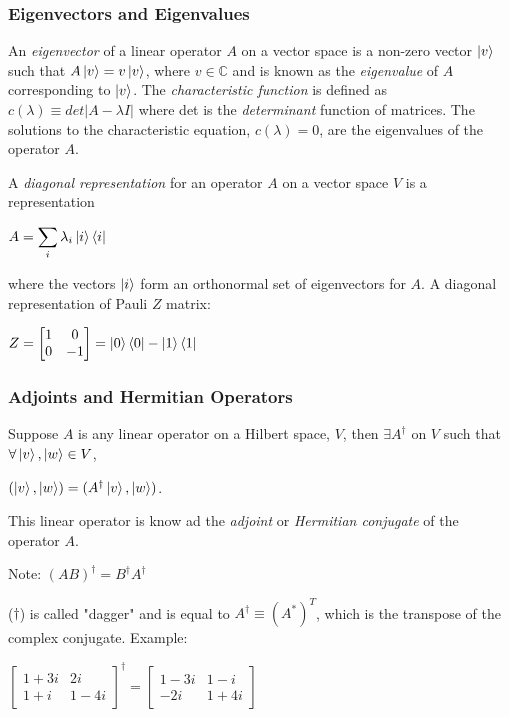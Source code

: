 \documentclass{article}
\begin{document}
\subsubsection{Eigenvectors and Eigenvalues}
An \emph{eigenvector} of a linear operator $A$ on a vector space is a non-zero
vector $\ket{v}$ such that $A\ket{v} = v\ket{v}$, where $v \in \mathbb{C}$ and
is known as the \emph{eigenvalue} of $A$ corresponding to $\ket{v}$. The
\emph{characteristic function} is defined as
$c(\lambda) \equiv det |A - \lambda I|$ where det is the \emph{determinant}
function of matrices. The solutions to the characteristic equation,
$c(\lambda) = 0$, are the eigenvalues of the operator $A$.

A \emph{diagonal representation} for an operator $A$ on a vector space $V$ is
a representation
  \begin{center}
    $A = \displaystyle\sum_{i}\lambda_{i}\ket{i}\bra{i}$
  \end{center}
where the vectors $\ket{i}$ form an orthonormal set of eigenvectors for $A$.
A diagonal representation of Pauli $Z$ matrix:
  \begin{center}
    $Z = \begin{bmatrix} 1 & 0 \\ 0 & -1\end{bmatrix} =
    \ket{0}\bra{0} - \ket{1}\bra{1}$
  \end{center}

\subsubsection{Adjoints and Hermitian Operators}
Suppose $A$ is any linear operator on a Hilbert space, $V$, then
$\exists A^{\dagger}$ on $V$ such that $\forall \ket{v}, \ket{w} \in V$,
  \begin{center}
    $(\ket{v}, \ket{w}) = (A^{\dagger}\ket{v}, \ket{w})$.
  \end{center}

This linear operator is know ad the \emph{adjoint} or \emph{Hermitian conjugate}
of the operator $A$.

Note: $(AB)^{\dagger} = B^{\dagger}A^{\dagger}$

($\dagger$) is called "dagger" and is equal to
$A^{\dagger} \equiv (A^{*})^{T}$, which is the transpose of the complex
conjugate. Example:
  \begin{center}
    $
    \begin{bmatrix}
      1 + 3i & 2i \\
      1 + i & 1 - 4i
    \end{bmatrix}^{\dagger} = 
    \begin{bmatrix}
      1 - 3i & 1 - i \\
      -2i & 1 + 4i
    \end{bmatrix}
    $
  \end{center}
\end{document}
